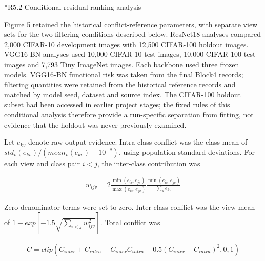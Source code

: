 \documentclass[11pt,a4paper]{article}
\makeatletter
\renewcommand\subsection{\@startsection{subsection}{2}{\z@}{-1.8ex plus -.5ex minus -.2ex}{.7ex plus .2ex}{\normalfont\normalsize\bfseries\raggedright}}
\makeatother
\begin{document}
\subsection*{R5.2 Conditional residual-ranking analysis}\label{s5.2-conditional-residual-ranking-analysis}

Figure 5 retained the historical conflict-reference parameters, with separate view sets for the two filtering conditions described below. ResNet18 analyses compared 2,000 CIFAR-10 development images with 12,500 CIFAR-100 holdout images. VGG16-BN analyses used 10,000 CIFAR-10 test images, 10,000 CIFAR-100 test images and 7,793 Tiny ImageNet images. Each backbone used three frozen models. VGG16-BN functional risk was taken from the final Block4 records; filtering quantities were retained from the historical reference records and matched by model seed, dataset and source index. The CIFAR-100 holdout subset had been accessed in earlier project stages; the fixed rules of this conditional analysis therefore provide a run-specific separation from fitting, not evidence that the holdout was never previously examined.

\begin{sloppypar}
Let \(e_{kv}\) denote raw output evidence. Intra-class conflict was the class mean of \({std}_{v}\left( e_{kv} \right)/\left( {mean}_{v}\left( e_{kv} \right) + 10^{- 8} \right)\), using population standard deviations. For each view and class pair \(i < j\), the inter-class contribution was
\end{sloppypar}

\begin{equation}
\begin{array}{r}
w_{ijv} = 2\frac{\min\left( e_{iv},e_{jv} \right)}{\max\left( e_{iv},e_{jv} \right)}\frac{\min\left( e_{iv},e_{jv} \right)}{\sum_{k}^{}e_{kv}}
\end{array}
\label{eq:supp25}
\end{equation}

\begin{sloppypar}
Zero-denominator terms were set to zero. Inter-class conflict was the view mean of \(1 - exp\left\lbrack - 1.5\sqrt{\sum_{i < j}^{}w_{ijv}^{2}} \right\rbrack\). Total conflict was
\end{sloppypar}

\begin{equation}
\begin{array}{r}
C = clip\left( C_{inter} + C_{intra} - C_{inter}C_{intra} - 0.5\left( C_{inter} - C_{intra} \right)^{2},0,1 \right)
\end{array}
\label{eq:supp26}
\end{equation}
\end{document}
